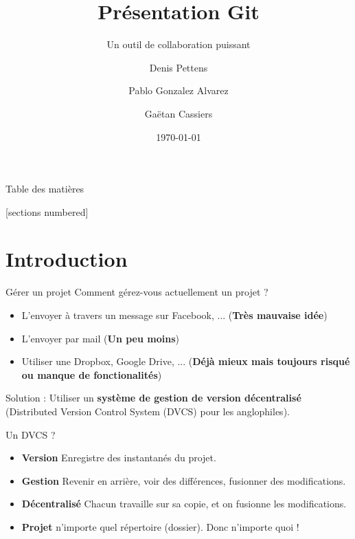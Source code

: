 \documentclass{beamer}
\title{Présentation Git}
\subtitle{Un outil de collaboration puissant}
\date{\today}
\author{Denis Pettens \and Pablo Gonzalez Alvarez \and Gaëtan Cassiers}
\institute{Louvain-li-Nux}
\begin{document}
\maketitle

\begin{frame}{Table des matières}

[sections numbered]
\tableofcontents[hideallsubsections]

\end{frame}

\section{Introduction}

\begin{frame}{Gérer un projet}
Comment gérez-vous actuellement un projet ?

\begin{itemize}
    \item L'envoyer à travers un message sur Facebook, ... (\textbf{Très mauvaise idée})
    \item L'envoyer par mail (\textbf{Un peu moins})
    \item Utiliser une Dropbox, Google Drive, ... (\textbf{Déjà mieux mais toujours risqué ou manque de fonctionalités})
\end{itemize}

Solution : Utiliser un \textbf{système de gestion de version décentralisé}
(Distributed Version Control System (DVCS) pour les anglophiles).
\end{frame}

\begin{frame}{Un DVCS ?}
    \begin{itemize}
        \item \textbf{Version} Enregistre des \og{}instantanés\fg{} du projet.
        \item \textbf{Gestion} Revenir en arrière, voir des différences,
            fusionner des modifications.
        \item \textbf{Décentralisé} Chacun travaille sur sa copie, et on fusionne les modifications.
        \item \textbf{Projet} n'importe quel répertoire (\og dossier\fg). Donc n'importe quoi !
    \end{itemize}
\end{frame}
\end{document}
